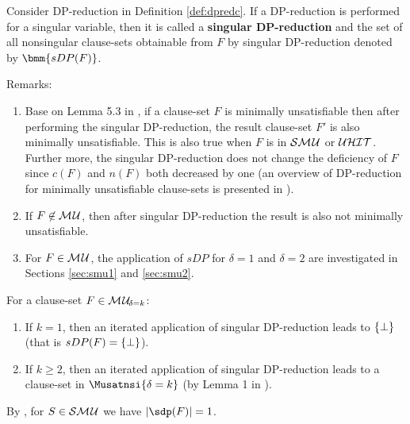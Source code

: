 \documentclass{report}
\begin{document}
\begin{defi}\label{def:singularDP}
Consider DP-reduction in Definition \ref{def:dpredc}. If a DP-reduction is performed for a singular variable, then it is called a \textbf{singular DP-reduction} and the set of all nonsingular clause-sets obtainable from $F$ by singular DP-reduction denoted by $\bmm{sDP(F)}$. 
\end{defi}
Remarks:
  \begin{enumerate}
  \item Base on Lemma 5.3 in \cite{KullmannZhao2010Extremal}, if a clause-set $F$ is minimally unsatisfiable then after performing the singular DP-reduction, the result clause-set $F'$ is also minimally unsatisfiable. This is also true when $F$ is in $\mathcal{S}\mathcal{M\hspace{0.8pt}U}$ or $\mathcal{U}\mathcal{HIT}$.   Further more, the singular DP-reduction does not change the deficiency of $F$ since $c(F)$ and $n(F)$ both decreased by one (an overview of DP-reduction for minimally unsatisfiable clause-sets is presented in \cite{KullmannZhao2012ConfluenceJ}).
  \item If $F \not \in \mathcal{M\hspace{0.8pt}U}$, then after singular DP-reduction the result is also not minimally unsatisfiable.
  \item For $F \in \mathcal{M\hspace{0.8pt}U}$, the application of $sDP$ for $\delta=1$ and $\delta=2$ are investigated in Sections \ref{sec:smu1} and \ref{sec:smu2}.
  \end{enumerate}
  
\begin{lem}\label{lem:sDP-infl}
For a clause-set $F \in \mathcal{M\hspace{0.8pt}U}_{\!\delta=k}$:
  \begin{enumerate}
  \item If $k=1$, then an iterated application of singular DP-reduction leads to $\{ \bot \}$ (that is $sDP(F)=\{ \bot \}$).
  \item If $k \ge 2$, then an iterated application of singular DP-reduction leads to a clause-set in $\Musatnsi{\delta=k}$ (by Lemma 1 in \cite{KleineBuening2000SubclassesMU}).
  \end{enumerate}
\end{lem} 

\begin{lem}\label{lem:sDP-size}
By \cite{KullmannZhao2012ConfluenceJ}, for $S \in \mathcal{S}\mathcal{M\hspace{0.8pt}U}$ we have $\abs{\sdp(F)} = 1$.
\end{lem} 
\end{document}

